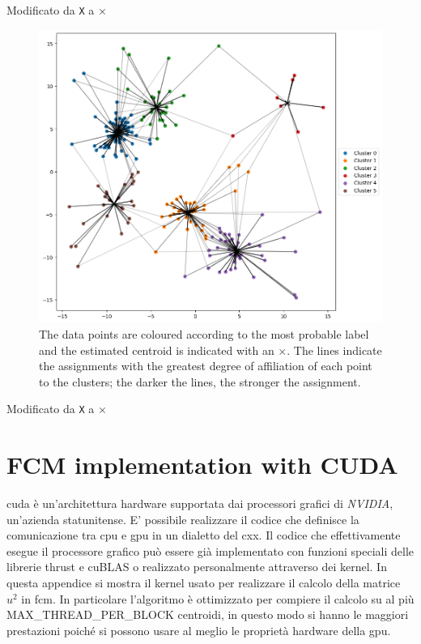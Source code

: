 \begin{modified}
Modificato da \texttt{X} a $\times$
\end{modified}
\begin{figure}[h]
    \centering
    \includegraphics[width=0.9\linewidth]{Figures/dati_fcm.png}
    \caption[example of \gls{fcm} clustering]{The data points are coloured according to the most probable label and the estimated centroid is indicated with an $\times$. The lines indicate the assignments with the greatest degree of affiliation of each point to the clusters; the darker the lines, the stronger the assignment.}
    \label{fig:data_fcm}
\end{figure}
\begin{modified}
Modificato da \texttt{X} a $\times$
\end{modified}

\chapter{FCM implementation with CUDA} \label{appendix:fcm_kernel}
\gls{cuda} è un'architettura hardware supportata dai processori grafici di \emph{NVIDIA}, un'azienda statunitense. E' possibile realizzare il codice che definisce la comunicazione tra \gls{cpu} e \gls{gpu} in un dialetto del \gls{cxx}. Il codice che effettivamente esegue il processore grafico può essere già implementato con funzioni speciali delle librerie \gls{thrust} e \gls{cuBLAS} o realizzato personalmente attraverso dei kernel. In questa appendice si mostra il kernel usato per realizzare il calcolo della matrice $u^2$ in \gls{fcm}. In particolare l'algoritmo è ottimizzato per compiere il calcolo su al più MAX\_THREAD\_PER\_BLOCK centroidi, in questo modo si hanno le maggiori prestazioni poiché si possono usare al meglio le proprietà hardware della \gls{gpu}.

